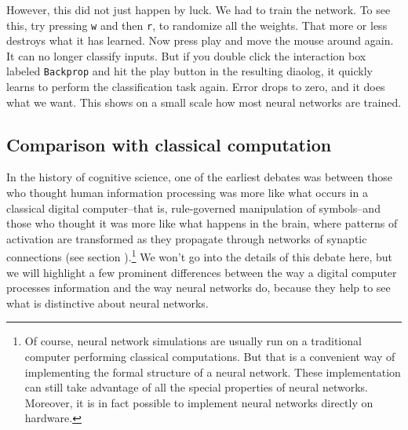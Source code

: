 However, this did not just happen by luck. We had to train the network. To see this, try pressing \texttt{w} and then \texttt{r}, to randomize all the weights. That more or less destroys what it has learned. Now press play and move the mouse around again. It can no longer classify inputs. But if you double click the interaction box labeled \texttt{Backprop} and hit the play button in the resulting diaolog, it quickly learns to perform the classification task again. Error drops to zero, and it does what we want. This shows on a small scale how most neural networks are trained.

\subsection{Comparison with classical computation}\label{classicalAIComparison}

In the history of cognitive science, one of the earliest debates was between those who thought human information processing was more like what occurs in a classical digital computer--that is, rule-governed manipulation of symbols--and those who thought it was more like what happens in the brain, where patterns of activation are transformed as they propagate through networks of synaptic connections (see section ).\footnote{Of course, neural network simulations are usually run on a traditional computer performing classical computations. But that is a convenient way of implementing the formal structure of a neural network. These implementation can still take advantage of all the special properties of neural networks. Moreover, it is in fact possible to implement neural networks directly on hardware.} We won't go into the details of this debate here, but we will highlight a few prominent differences between the way a digital computer processes information and the way neural networks do, because they help to see what is distinctive about neural networks.

